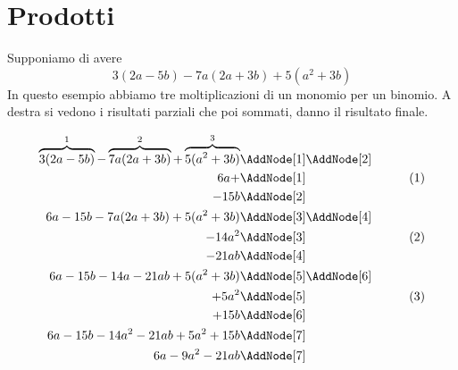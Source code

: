 \section{Prodotti}
\begin{esempiot}{}{}
Supponiamo di avere \[3(2a-5b)-7a(2a+3b)+5(a^2+3b)\]
In questo esempio abbiamo tre moltiplicazioni di un monomio per un binomio. A destra si vedono i risultati parziali  che poi sommati, danno il risultato finale.
\begin{NodesList}
	\begin{align*}
		\overbrace{3(2a-5b)}^{1}-\overbrace{7a(2a+3b)}^{2}+\overbrace{5(a^2+3b)}^{3}&\AddNode[1]\AddNode[2]\\
		6a+&\AddNode[1]&\tag{1}\\ 
		-15b&\AddNode[2]&\\
		6a-15b-7a(2a+3b)+5(a^2+3b)&\AddNode[3]\AddNode[4]\\
		-14a^2&\AddNode[3]&\tag{2}\\    
		-21ab&\AddNode[4]&\\
		6a-15b-14a-21ab+5(a^2+3b)&\nonumber\AddNode[5]\AddNode[6]\\
		+5a^2&\AddNode[5]&\tag{3}\\
		+15b&\AddNode[6]&\\
		6a-15b-14a^2-21ab+5a^2+15b&\nonumber\AddNode[7]&\\   
		6a-9a^2-21ab&\nonumber\AddNode[7] 
	\end{align*}
\end{NodesList}
\end{esempiot}
